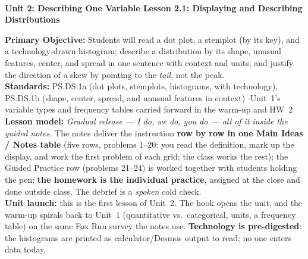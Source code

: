 \documentclass[10pt]{article}
\newcommand{\UnitNumberName}{Unit 2: Describing One Variable \quad}
\newcommand{\LessonNumberName}{Lesson 2.1: Displaying and Describing Distributions}
\begin{document}
\begin{center}
    {\Large\bfseries \CourseName \\
    {\small\bfseries \UnitNumberName \LessonNumberName}}
\end{center}

\begin{tcolorbox}[colback=frost, colframe=cerulean, boxrule=0.9pt, arc=2mm,
    left=2mm, right=2mm, top=1.5mm, bottom=1.5mm]
    \textbf{Primary Objective:} Students will read a dot plot, a stemplot (by its key), and a
    technology-drawn histogram; describe a distribution by its shape, unusual features, center,
    and spread in one sentence with context and units; and justify the direction of a skew by
    pointing to the \emph{tail}, not the peak.
    \\[2pt]
    \textbf{Standards:} PS.DS.1a (dot plots, stemplots, histograms, with technology),
    PS.DS.1b (shape, center, spread, and unusual features in context) \quad$\cdot$\quad Unit~1's
    variable types and frequency tables carried forward in the warm-up and HW~2
    \\[2pt]
    \textbf{Lesson model:} \emph{Gradual release --- I do, we do, you do --- all of it inside
    the guided notes.} The notes deliver the instruction \textbf{row by row in one Main Ideas /
    Notes table} (five rows, problems 1--20: you read the definition, mark up the display, and
    work the first problem of each grid; the class works the rest); the Guided Practice row
    (problems 21--24) is worked together with students holding the pen; \textbf{the homework is
    the individual practice}, assigned at the close and done outside class. The debrief is a
    \emph{spoken} cold check.
    \\[2pt]
    \textbf{Unit launch:} this is the first lesson of Unit~2. The hook opens the unit, and the
    warm-up spirals back to Unit~1 (quantitative vs.\ categorical, units, a frequency table) on
    the same Fox Run survey the notes use. \textbf{Technology is pre-digested}: the histograms
    are printed as calculator/Desmos output to read; no one enters data today.
\end{tcolorbox}
\end{document}
